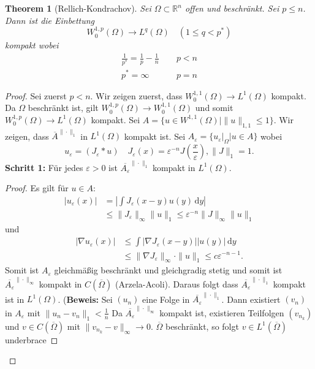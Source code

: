\documentclass[
paper=a4,
bibtotocnumbered,
liststotocnumbered,
tablecaptionabove,
pointlessnumbers,
twoside,
openright,
10pt
]
{report}
\newtheorem{thm}{Theorem}[chapter]
\theoremstyle{definition}
\numberwithin{equation}{chapter}
\begin{document}
\begin{thm}[Rellich-Kondrachov]
 Sei $\Omega \subset \mathbb R^n$ offen und beschränkt. Sei $p\le n$. Dann ist die Einbettung 
 \begin{equation}
  W_0^{1,p}(\Omega) \to L^q(\Omega) \quad (1\le q < p^*)
 \end{equation}
 kompakt wobei
 \begin{align*}
  \frac{1}{p^*} = \frac{1}{p} - \frac{1}{n} &\ \quad p<n\\
  p^*=\infty &\ \quad p=n
 \end{align*}
\end{thm}
\begin{proof}
Sei zuerst $p<n$. Wir zeigen zuerst, dass $W_0^{1,1}(\Omega) \to L^1(\Omega)$ kompakt. Da $\Omega$ beschränkt ist, gilt $W_0^{1,p}(\Omega) \to W_0^{1,1}(\Omega)$ und somit $W_0^{1,p}(\Omega) \to L^1(\Omega)$ kompakt. Sei $A=\{u\in W^{1,1}(\Omega) |\|u\|_{1,1} \le 1\}$. Wir zeigen, dass $\overline{A}^{\|\cdot\|_1}$ in $L^1(\Omega)$ kompakt ist. Sei $A_\varepsilon = \{u_\varepsilon\big |_\Omega |u\in A\}$ wobei
\begin{equation}
 u_\varepsilon = (J_\varepsilon * u) \quad J_\varepsilon(x) = \varepsilon^{-n} J( \frac{x}{\varepsilon}), \|J\|_1=1. 
\end{equation}
\textbf{Schritt 1:} Für jedes $\varepsilon >0$ ist $\overline{A_{\varepsilon}}^{\|\cdot\|_1}$ kompakt in $L^1(\Omega)$.
\begin{proof}
Es gilt für $u\in A$:
\begin{align*}
 |u_\varepsilon(x)| &= |\int J_\varepsilon(x-y) u(y) \, \mathrm dy| \\
 &\le \| J_\varepsilon \|_\infty \| u \|_1 \le \varepsilon^{-n} \| J\|_\infty\|u\|_1
\end{align*}
und 
\begin{align*}
 |\nabla u_\varepsilon(x)| &\le \int |\nabla J_\varepsilon(x-y)||u(y)|\, \mathrm dy\\
 &\le \| \nabla J_{\varepsilon}\|_\infty \cdot \|u\|_1 \le c \varepsilon^{-n-1}.
\end{align*}
Somit ist $A_\varepsilon$ gleichmäßig beschränkt und gleichgradig stetig und somit ist
$\overline{A_\varepsilon}^{\|\cdot \|_\infty}$ kompakt in $C(\overline{\Omega})$ (Arzela-Acoli). Daraus folgt dass $\overline{A_\varepsilon}^{\| \cdot \|_1}$ kompakt ist in $L^1(\Omega)$.
(\textbf{Beweis:} Sei $(u_n)$ eine Folge in $\overline{A_\varepsilon}^{\|\cdot \|_1}$. Dann existiert $(v_n)$ in $A_\varepsilon$ mit $\| u_n - v_n\|_1 < \frac{1}{n}$ Da $\overline{A_\varepsilon}^{\|\cdot \|_\infty}$ kompakt ist, existieren Teilfolgen $(v_{n_k})$ und $v\in C(\overline{\Omega})$ mit $\| v_{n_k} -v\|_\infty \to 0$. $\overline \Omega$ beschränkt, so folgt $v\in L^1(\overline{\Omega})$ underbrace

\end{proof}
\end{proof}
\end{document}
